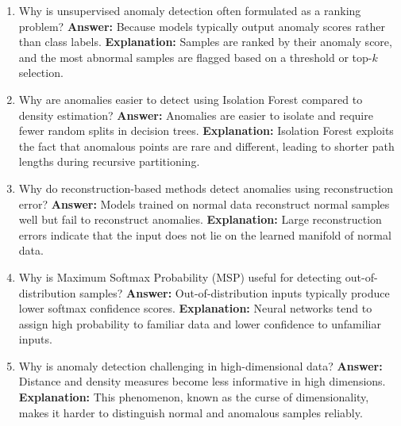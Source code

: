 \documentclass{article}
\begin{document}
\begin{enumerate}
\item Why is unsupervised anomaly detection often formulated as a ranking problem?\newline
\textbf{Answer:} Because models typically output anomaly scores rather than class labels.\newline
\textbf{Explanation:} Samples are ranked by their anomaly score, and the most abnormal samples are flagged based on a threshold or top-$k$ selection.

\item Why are anomalies easier to detect using Isolation Forest compared to density estimation?\newline
\textbf{Answer:} Anomalies are easier to isolate and require fewer random splits in decision trees.\newline
\textbf{Explanation:} Isolation Forest exploits the fact that anomalous points are rare and different, leading to shorter path lengths during recursive partitioning.

\item Why do reconstruction-based methods detect anomalies using reconstruction error?\newline
\textbf{Answer:} Models trained on normal data reconstruct normal samples well but fail to reconstruct anomalies.\newline
\textbf{Explanation:} Large reconstruction errors indicate that the input does not lie on the learned manifold of normal data.

\item Why is Maximum Softmax Probability (MSP) useful for detecting out-of-distribution samples?\newline
\textbf{Answer:} Out-of-distribution inputs typically produce lower softmax confidence scores.\newline
\textbf{Explanation:} Neural networks tend to assign high probability to familiar data and lower confidence to unfamiliar inputs.

\item Why is anomaly detection challenging in high-dimensional data?\newline
\textbf{Answer:} Distance and density measures become less informative in high dimensions.\newline
\textbf{Explanation:} This phenomenon, known as the curse of dimensionality, makes it harder to distinguish normal and anomalous samples reliably.

\end{enumerate}
\end{document}
